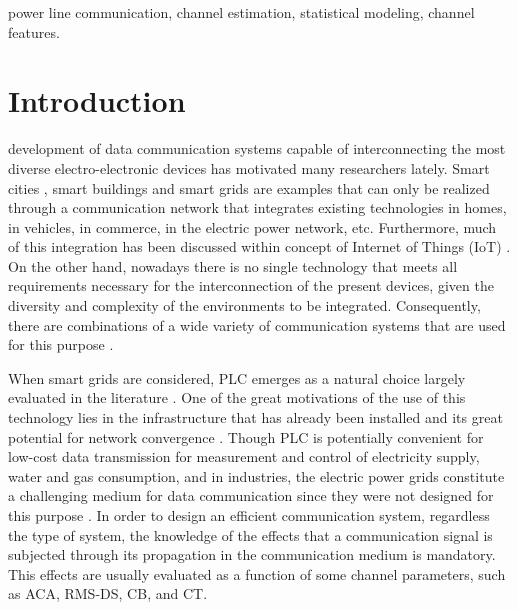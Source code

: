 \documentclass[journal]{IEEEtran}
\begin{document}
\begin{IEEEkeywords}
power line communication, channel estimation, statistical modeling, channel features.
\end{IEEEkeywords}
\acresetall

\section{Introduction}\label{sec:intro}
 development of data communication systems capable of interconnecting the most diverse electro-electronic devices has motivated many researchers lately. Smart cities \cite{Andrisano2018}, smart buildings \cite{Minoli2017} and smart grids \cite{Masera2018} are examples that can only be realized through a communication network that integrates existing technologies in homes, in vehicles, in commerce, in the electric power network, etc. Furthermore, much of this integration has been discussed within concept of Internet of Things (IoT) \cite{Atzori2010}. On the other hand, nowadays there is no single technology that meets all requirements necessary for the interconnection of the present devices, given the diversity and complexity of the environments to be integrated. Consequently, there are combinations of a wide variety of communication systems that are used for this purpose \cite{Mehmood2017, M.B.A.Dib2018}.

When smart grids are considered, \ac{PLC} emerges as a natural choice largely evaluated in the literature \cite{Yan2013, Han2017, Artale2018}. One of the great motivations of the use of this technology lies in the infrastructure that has already been installed and its great potential for network convergence \cite{Willie2006,M.B.A.Dib2018,Oliveira2017}. Though \ac{PLC} is potentially convenient for low-cost data transmission for measurement and control of electricity supply, water and gas consumption, and in industries, the electric power grids constitute a challenging medium for data communication since they were not designed for this purpose \cite{Corripio2006,Musolino2008,Zimmermann2000}. In order to design an efficient communication system, regardless the type of system, the knowledge of the effects that a communication signal is subjected through its propagation in the communication medium is mandatory. This effects are usually evaluated as a function of some channel parameters, such as \ac{ACA}, \ac{RMS-DS}, \ac{CB}, and \ac{CT}.    
\end{document}
